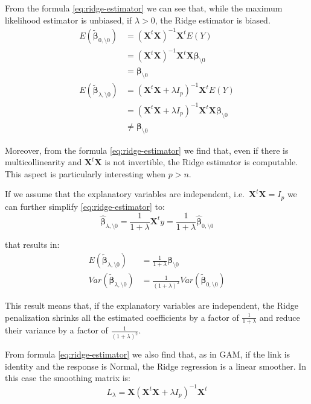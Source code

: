 \documentclass[a4paper, nobind]{templates/ociamthesis}
\theoremstyle{definition}
\theoremstyle{definition}
\theoremstyle{definition}
\theoremstyle{remark}
\begin{document}
From the formula \eqref{eq:ridge-estimator} we can see that, while the maximum likelihood estimator is unbiased, if \(\lambda>0\), the Ridge estimator is biased.
\begin{align*}
E\left(\tilde{\boldsymbol{\beta}}_{0,\setminus0}\right) & =
\left(\boldsymbol{X}^t\boldsymbol{X}\right)^{-1}\boldsymbol{X}^t E(Y) \\ & =
\left(\boldsymbol{X}^t\boldsymbol{X}\right)^{-1}\boldsymbol{X}^t \boldsymbol{X} \boldsymbol{\beta}_{\setminus0} \\ & =
\boldsymbol{\beta}_{\setminus0} \\[6pt]
E\left(\tilde{\boldsymbol{\beta}}_{\lambda,\setminus0}\right) & =
\left(\boldsymbol{X}^t\boldsymbol{X}+\lambda I_p\right)^{-1}\boldsymbol{X}^t E(Y) \\ & =
\left(\boldsymbol{X}^t\boldsymbol{X}+\lambda I_p\right)^{-1}\boldsymbol{X}^t\boldsymbol{X} \boldsymbol{\beta}_{\setminus0} \\ & \neq
\boldsymbol{\beta}_{\setminus0}
\end{align*}

Moreover, from the formula \eqref{eq:ridge-estimator} we find that, even if there is multicollinearity and \(\boldsymbol{X}^t\boldsymbol{X}\) is not invertible, the Ridge estimator is computable. This aspect is particularly interesting when \(p > n\).

If we assume that the explanatory variables are independent, i.e.~\(\boldsymbol{X}^t\boldsymbol{X} = I_p\) we can further simplify \eqref{eq:ridge-estimator} to:
\[
\hat{\boldsymbol{\beta}}_{\lambda,\setminus0} =
\frac{1}{1+\lambda} \boldsymbol{X}^t y = 
\frac{1}{1+\lambda} \hat{\boldsymbol{\beta}}_{0,\setminus0}
\]

that results in:
\begin{align*}
E\left(\tilde{\boldsymbol{\beta}}_{\lambda,\setminus0}\right) & =
\frac{1}{1+\lambda} \boldsymbol{\beta}_{\setminus0} \\
Var\left(\tilde{\boldsymbol{\beta}}_{\lambda,\setminus0} \right) & =
\frac{1}{\left(1+\lambda\right)^2} Var\left( \tilde{\boldsymbol{\beta}}_{0,\setminus0} \right)
\end{align*}

This result means that, if the explanatory variables are independent, the Ridge penalization shrinks all the estimated coefficients by a factor of \(\frac{1}{1+\lambda}\) and reduce their variance by a factor of \(\frac{1}{\left(1+\lambda\right)^2}\).

From formula \eqref{eq:ridge-estimator} we also find that, as in GAM, if the link is identity and the response is Normal, the Ridge regression is a linear smoother. In this case the smoothing matrix is:
\[
L_{\lambda} = \boldsymbol{X} \left(\boldsymbol{X}^t\boldsymbol{X}+\lambda I_p\right)^{-1}\boldsymbol{X}^t
\]
\end{document}
